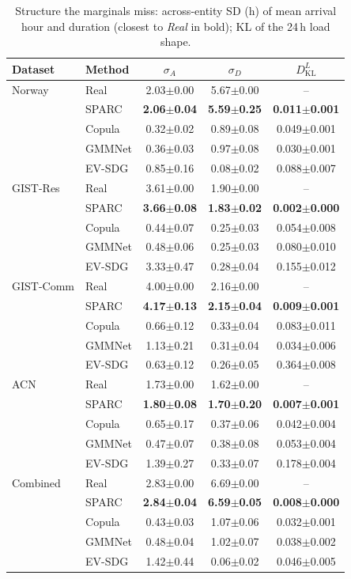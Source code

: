 \documentclass[journal]{IEEEtran}
\begin{document}
\begin{table}[t]
\centering
\caption{Structure the marginals miss: across-entity SD (h) of mean arrival hour and duration (closest to \emph{Real} in bold); KL of the 24\,h load shape.}
\label{tab:heterogeneity}
\footnotesize
\begin{tabular}{llccc}
\toprule
Dataset & Method & $\sigma_A$ & $\sigma_D$ & $D_{\mathrm{KL}}^{L}$ \\
\midrule
Norway & Real & 2.03$\pm$0.00 & 5.67$\pm$0.00 & -- \\
 & SPARC & \textbf{2.06$\pm$0.04} & \textbf{5.59$\pm$0.25} & \textbf{0.011$\pm$0.001} \\
 & Copula & 0.32$\pm$0.02 & 0.89$\pm$0.08 & 0.049$\pm$0.001 \\
 & GMMNet & 0.36$\pm$0.03 & 0.97$\pm$0.08 & 0.030$\pm$0.001 \\
 & EV-SDG & 0.85$\pm$0.16 & 0.08$\pm$0.02 & 0.088$\pm$0.007 \\
\midrule
GIST-Res & Real & 3.61$\pm$0.00 & 1.90$\pm$0.00 & -- \\
 & SPARC & \textbf{3.66$\pm$0.08} & \textbf{1.83$\pm$0.02} & \textbf{0.002$\pm$0.000} \\
 & Copula & 0.44$\pm$0.07 & 0.25$\pm$0.03 & 0.054$\pm$0.008 \\
 & GMMNet & 0.48$\pm$0.06 & 0.25$\pm$0.03 & 0.080$\pm$0.010 \\
 & EV-SDG & 3.33$\pm$0.47 & 0.28$\pm$0.04 & 0.155$\pm$0.012 \\
\midrule
GIST-Comm & Real & 4.00$\pm$0.00 & 2.16$\pm$0.00 & -- \\
 & SPARC & \textbf{4.17$\pm$0.13} & \textbf{2.15$\pm$0.04} & \textbf{0.009$\pm$0.001} \\
 & Copula & 0.66$\pm$0.12 & 0.33$\pm$0.04 & 0.083$\pm$0.011 \\
 & GMMNet & 1.13$\pm$0.21 & 0.31$\pm$0.04 & 0.034$\pm$0.006 \\
 & EV-SDG & 0.63$\pm$0.12 & 0.26$\pm$0.05 & 0.364$\pm$0.008 \\
\midrule
ACN & Real & 1.73$\pm$0.00 & 1.62$\pm$0.00 & -- \\
 & SPARC & \textbf{1.80$\pm$0.08} & \textbf{1.70$\pm$0.20} & \textbf{0.007$\pm$0.001} \\
 & Copula & 0.65$\pm$0.17 & 0.37$\pm$0.06 & 0.042$\pm$0.004 \\
 & GMMNet & 0.47$\pm$0.07 & 0.38$\pm$0.08 & 0.053$\pm$0.004 \\
 & EV-SDG & 1.39$\pm$0.27 & 0.33$\pm$0.07 & 0.178$\pm$0.004 \\
\midrule
Combined & Real & 2.83$\pm$0.00 & 6.69$\pm$0.00 & -- \\
 & SPARC & \textbf{2.84$\pm$0.04} & \textbf{6.59$\pm$0.05} & \textbf{0.008$\pm$0.000} \\
 & Copula & 0.43$\pm$0.03 & 1.07$\pm$0.06 & 0.032$\pm$0.001 \\
 & GMMNet & 0.48$\pm$0.04 & 1.02$\pm$0.07 & 0.038$\pm$0.002 \\
 & EV-SDG & 1.42$\pm$0.44 & 0.06$\pm$0.02 & 0.046$\pm$0.005 \\
\bottomrule
\end{tabular}
\end{table}
\end{document}
